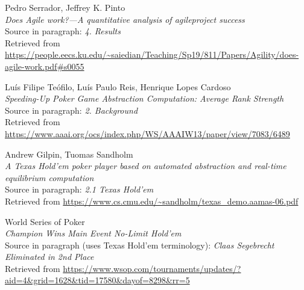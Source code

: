 \documentclass[11pt]{article}
\begin{document}
\renewcommand\refname{Bibliography}
\begin{thebibliography}{9}

\hypertarget{agile_success}{}
\begin{flushleft}
	Pedro Serrador, Jeffrey K. Pinto \\
	\textit{Does Agile work?—A quantitative analysis of agileproject success} \\
	Source in paragraph: \textit{4. Results} \\
	Retrieved from \url{https://people.eecs.ku.edu/~saiedian/Teaching/Sp19/811/Papers/Agility/does-agile-work.pdf#s0055}
\end{flushleft}


\begin{flushleft}
\hypertarget{lookup}{}
	Luís Filipe Teófilo, Luís Paulo Reis, Henrique Lopes Cardoso \\
	\textit{Speeding-Up Poker Game Abstraction Computation: Average Rank Strength} \\
	Source in paragraph: \textit{2. Background} \\
	Retrieved from \url{https://www.aaai.org/ocs/index.php/WS/AAAIW13/paper/view/7083/6489}
\end{flushleft}

\begin{flushleft}
\hypertarget{research_texas}{}
	Andrew Gilpin, Tuomas Sandholm \\
	\textit{A Texas Hold’em poker player based on automated abstraction and real-time equilibrium computation} \\
	Source in paragraph: \textit{2.1 Texas Hold'em} \\
	Retrieved from \url{https://www.cs.cmu.edu/~sandholm/texas_demo.aamas-06.pdf}
\end{flushleft}


\hypertarget{wsop_texas}{}
\begin{flushleft}
	World Series of Poker \\
	\textit{Champion Wins Main Event No-Limit Hold'em} \\
	Source in paragraph (uses Texas Hold'em terminology): \textit{Claas Segebrecht Eliminated in 2nd Place} \\
	Retrieved from \url{https://www.wsop.com/tournaments/updates/?aid=4&grid=1628&tid=17580&dayof=8298&rr=5}
\end{flushleft}


\end{thebibliography}
\end{document}
